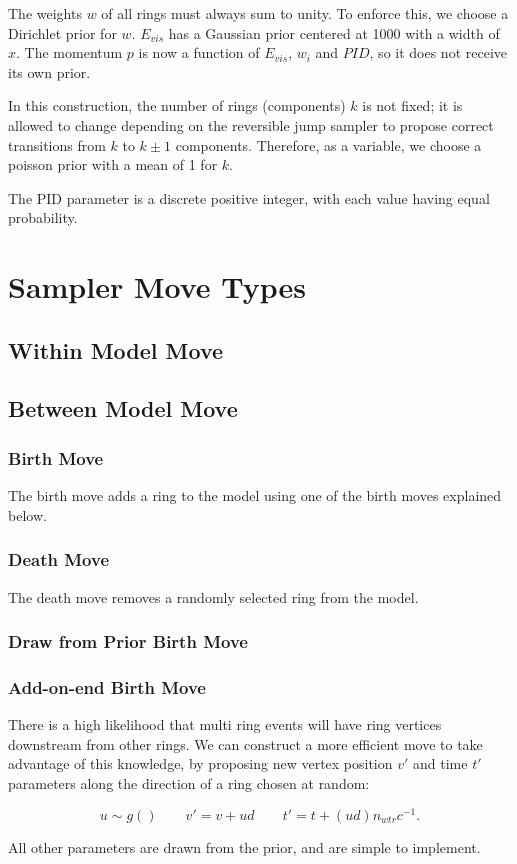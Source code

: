 \documentclass[11pt]{article} %
\begin{document}
The weights $w$ of all rings must always sum to unity. To enforce this, we choose a Dirichlet prior for $w$. $E_{vis}$ has a Gaussian prior centered at 1000 with a width of $x$. The momentum $p$ is now a function of $E_{vis}$, $w_{i}$ and $PID$, so it does not receive its own prior.

In this construction, the number of rings (components) $k$ is not fixed; it is allowed to change depending on the reversible jump sampler to propose correct transitions from $k$ to $k\pm1$ components. Therefore, as a variable, we choose a poisson prior with a mean of 1 for $k$.

The PID parameter is a discrete positive integer, with each value having equal probability.

\section{Sampler Move Types}
\subsection{Within Model Move}
\subsection{Between Model Move}
\subsubsection{Birth Move}
The birth move adds a ring to the model using one of the birth moves explained below.
\subsubsection{Death Move}
The death move removes a randomly selected ring from the model.
\subsubsection{Draw from Prior Birth Move}
\subsubsection{Add-on-end Birth Move}
There is a high likelihood that multi ring events will have ring vertices downstream from other rings. We can construct a more efficient move to take advantage of this knowledge, by proposing new vertex position $v'$ and time $t'$ parameters along the direction of a ring chosen at random:

\begin{equation}
u\sim g() \qquad v' = v + ud\qquad t' = t + (ud)n_{wtr}c^{-1}.
\end{equation}

All other parameters are drawn from the prior, and are simple to implement.

{}

\end{document}
